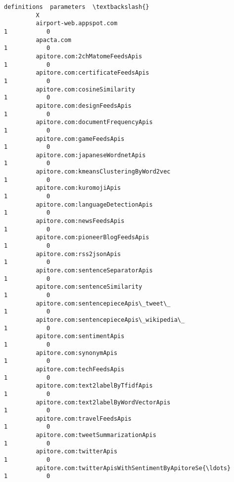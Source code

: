 \documentclass[11pt]{article}
\begin{document}
\begin{Verbatim}[commandchars=\\\{\}]
                                                             definitions  parameters  \textbackslash{}
         X                                                                             
         airport-web.appspot.com                                       1           0   
         apacta.com                                                    1           0   
         apitore.com:2chMatomeFeedsApis                                1           0   
         apitore.com:certificateFeedsApis                              1           0   
         apitore.com:cosineSimilarity                                  1           0   
         apitore.com:designFeedsApis                                   1           0   
         apitore.com:documentFrequencyApis                             1           0   
         apitore.com:gameFeedsApis                                     1           0   
         apitore.com:japaneseWordnetApis                               1           0   
         apitore.com:kmeansClusteringByWord2vec                        1           0   
         apitore.com:kuromojiApis                                      1           0   
         apitore.com:languageDetectionApis                             1           0   
         apitore.com:newsFeedsApis                                     1           0   
         apitore.com:pioneerBlogFeedsApis                              1           0   
         apitore.com:rss2jsonApis                                      1           0   
         apitore.com:sentenceSeparatorApis                             1           0   
         apitore.com:sentenceSimilarity                                1           0   
         apitore.com:sentencepieceApis\_tweet\_                          1           0   
         apitore.com:sentencepieceApis\_wikipedia\_                      1           0   
         apitore.com:sentimentApis                                     1           0   
         apitore.com:synonymApis                                       1           0   
         apitore.com:techFeedsApis                                     1           0   
         apitore.com:text2labelByTfidfApis                             1           0   
         apitore.com:text2labelByWordVectorApis                        1           0   
         apitore.com:travelFeedsApis                                   1           0   
         apitore.com:tweetSummarizationApis                            1           0   
         apitore.com:twitterApis                                       1           0   
         apitore.com:twitterApisWithSentimentByApitoreSe{\ldots}            1           0   

\end{Verbatim}
\end{document}
